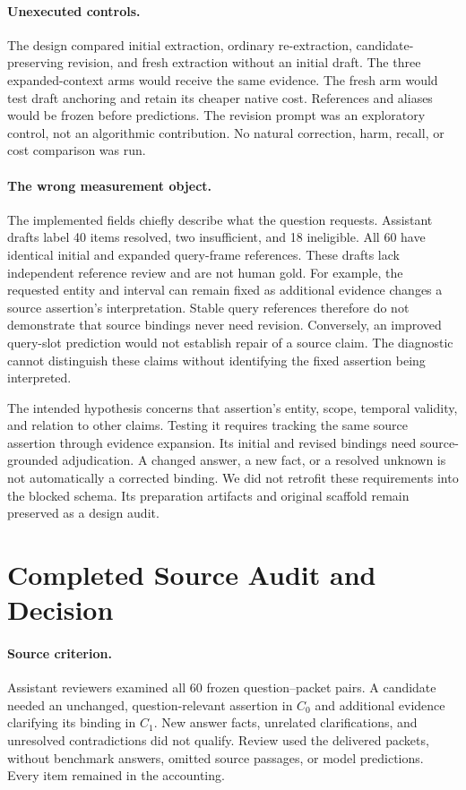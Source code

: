 \documentclass[11pt]{article}
\begin{document}
\paragraph{Unexecuted controls.}
The design compared initial extraction, ordinary re-extraction, candidate-preserving revision, and fresh extraction without an initial draft.
The three expanded-context arms would receive the same evidence.
The fresh arm would test draft anchoring and retain its cheaper native cost.
References and aliases would be frozen before predictions.
The revision prompt was an exploratory control, not an algorithmic contribution.
No natural correction, harm, recall, or cost comparison was run.

\paragraph{The wrong measurement object.}
The implemented fields chiefly describe what the question requests.
Assistant drafts label 40 items resolved, two insufficient, and 18 ineligible.
All 60 have identical initial and expanded query-frame references.
These drafts lack independent reference review and are not human gold.
For example, the requested entity and interval can remain fixed as additional evidence changes a source assertion's interpretation.
Stable query references therefore do not demonstrate that source bindings never need revision.
Conversely, an improved query-slot prediction would not establish repair of a source claim.
The diagnostic cannot distinguish these claims without identifying the fixed assertion being interpreted.

The intended hypothesis concerns that assertion's entity, scope, temporal validity, and relation to other claims.
Testing it requires tracking the same source assertion through evidence expansion.
Its initial and revised bindings need source-grounded adjudication.
A changed answer, a new fact, or a resolved unknown is not automatically a corrected binding.
We did not retrofit these requirements into the blocked schema.
Its preparation artifacts and original scaffold remain preserved as a design audit.

\section{Completed Source Audit and Decision}
\label{sec:sourceaudit}

\paragraph{Source criterion.}
Assistant reviewers examined all 60 frozen question--packet pairs.
A candidate needed an unchanged, question-relevant assertion in $C_0$ and additional evidence clarifying its binding in $C_1$.
New answer facts, unrelated clarifications, and unresolved contradictions did not qualify.
Review used the delivered packets, without benchmark answers, omitted source passages, or model predictions.
Every item remained in the accounting.
\end{document}
